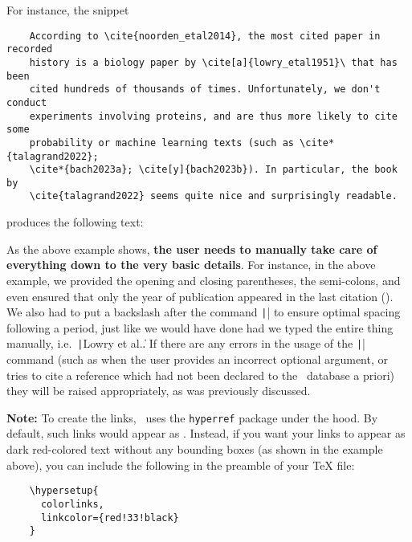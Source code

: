 \documentclass[letter, 12pt]{article}
\begin{document}
  For instance, the snippet
  \begin{verbatim}
    According to \cite{noorden_etal2014}, the most cited paper in recorded
    history is a biology paper by \cite[a]{lowry_etal1951}\ that has been 
    cited hundreds of thousands of times. Unfortunately, we don't conduct
    experiments involving proteins, and are thus more likely to cite some
    probability or machine learning texts (such as \cite*{talagrand2022};
    \cite*{bach2023a}; \cite[y]{bach2023b}). In particular, the book by
    \cite{talagrand2022} seems quite nice and surprisingly readable.
  \end{verbatim}
  produces the following text:

  \begin{center}
  \end{center}
  
  As the above example shows, \textbf{the user needs to manually take care of everything down to the very basic details}. For instance, in the above example, we provided the opening and closing parentheses, the semi-colons, and even ensured that only the year of publication appeared in the last citation (\cite*{bach2023b}). We also had to put a backslash after the command \texttt|\cite[a]{lowry_etal1951}| to ensure optimal spacing following a period, just like we would have done had we typed the entire thing manually, i.e.\ \texttt|Lowry et al.\|. If there are any errors in the usage of the \texttt|\cite{}| command (such as when the user provides an incorrect optional argument, or tries to cite a reference which had not been declared to the \dumbib\ database a priori) they will be raised appropriately, as was previously discussed.

  \noindent \textbf{Note:}  To create the links, \dumbib\ uses the \texttt{hyperref} package under the hood. By default, such links would appear as . Instead, if you want your links to appear as dark red-colored text without any bounding boxes (as shown in the example above), you can include the following in the preamble of your \TeX{} file:
  \begin{verbatim}
    \hypersetup{
      colorlinks,
      linkcolor={red!33!black}
    }
  \end{verbatim}
\end{document}
